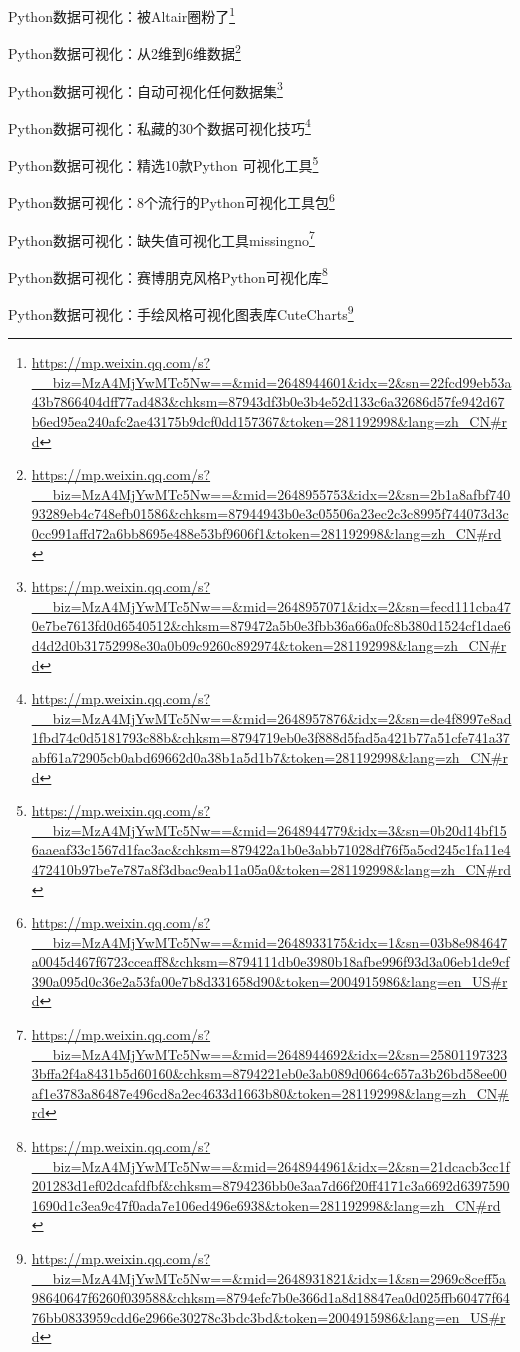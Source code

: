 \documentclass[]{ctexbook}
\renewcommand{\href}[2]{#2\footnote{\url{#1}}}
\begin{document}
\href{https://mp.weixin.qq.com/s?__biz=MzA4MjYwMTc5Nw==\&mid=2648944601\&idx=2\&sn=22fcd99eb53a43b7866404dff77ad483\&chksm=87943df3b0e3b4e52d133c6a32686d57fe942d67b6ed95ea240afc2ae43175b9dcf0dd157367\&token=281192998\&lang=zh_CN\#rd}{Python数据可视化：被Altair圈粉了}

\href{https://mp.weixin.qq.com/s?__biz=MzA4MjYwMTc5Nw==\&mid=2648955753\&idx=2\&sn=2b1a8afbf74093289eb4c748efb01586\&chksm=87944943b0e3c05506a23ec2c3c8995f744073d3c0cc991affd72a6bb8695e488e53bf9606f1\&token=281192998\&lang=zh_CN\#rd}{Python数据可视化：从2维到6维数据}

\href{https://mp.weixin.qq.com/s?__biz=MzA4MjYwMTc5Nw==\&mid=2648957071\&idx=2\&sn=fecd111cba470e7be7613fd0d6540512\&chksm=879472a5b0e3fbb36a66a0fc8b380d1524cf1dae6d4d2d0b31752998e30a0b09c9260c892974\&token=281192998\&lang=zh_CN\#rd}{Python数据可视化：自动可视化任何数据集}

\href{https://mp.weixin.qq.com/s?__biz=MzA4MjYwMTc5Nw==\&mid=2648957876\&idx=2\&sn=de4f8997e8ad1fbd74c0d5181793c88b\&chksm=8794719eb0e3f888d5fad5a421b77a51cfe741a37abf61a72905cb0abd69662d0a38b1a5d1b7\&token=281192998\&lang=zh_CN\#rd}{Python数据可视化：私藏的30个数据可视化技巧}

\href{https://mp.weixin.qq.com/s?__biz=MzA4MjYwMTc5Nw==\&mid=2648944779\&idx=3\&sn=0b20d14bf156aaeaf33c1567d1fac3ac\&chksm=879422a1b0e3abb71028df76f5a5cd245c1fa11e4472410b97be7e787a8f3dbac9eab11a05a0\&token=281192998\&lang=zh_CN\#rd}{Python数据可视化：精选10款Python 可视化工具}

\href{https://mp.weixin.qq.com/s?__biz=MzA4MjYwMTc5Nw==\&mid=2648933175\&idx=1\&sn=03b8e984647a0045d467f6723cceaff8\&chksm=8794111db0e3980b18afbe996f93d3a06eb1de9cf390a095d0c36e2a53fa00e7b8d331658d90\&token=2004915986\&lang=en_US\#rd}{Python数据可视化：8个流行的Python可视化工具包}

\href{https://mp.weixin.qq.com/s?__biz=MzA4MjYwMTc5Nw==\&mid=2648944692\&idx=2\&sn=258011973233bffa2f4a8431b5d60160\&chksm=8794221eb0e3ab089d0664c657a3b26bd58ee00af1e3783a86487e496cd8a2ec4633d1663b80\&token=281192998\&lang=zh_CN\#rd}{Python数据可视化：缺失值可视化工具missingno}

\href{https://mp.weixin.qq.com/s?__biz=MzA4MjYwMTc5Nw==\&mid=2648944961\&idx=2\&sn=21dcacb3cc1f201283d1ef02dcafdfbf\&chksm=8794236bb0e3aa7d66f20ff4171c3a6692d63975901690d1c3ea9c47f0ada7e106ed496e6938\&token=281192998\&lang=zh_CN\#rd}{Python数据可视化：赛博朋克风格Python可视化库}

\href{https://mp.weixin.qq.com/s?__biz=MzA4MjYwMTc5Nw==\&mid=2648931821\&idx=1\&sn=2969c8ceff5a98640647f6260f039588\&chksm=8794efc7b0e366d1a8d18847ea0d025ffb60477f6476bb0833959cdd6e2966e30278c3bdc3bd\&token=2004915986\&lang=en_US\#rd}{Python数据可视化：手绘风格可视化图表库CuteCharts}
\end{document}
